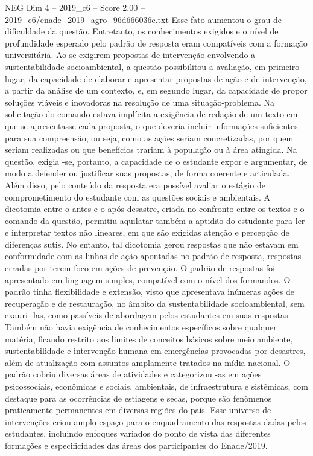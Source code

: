 \begin{textsample}{NEG Dim 4 – 2019\_c6 – Score 2.00 – 2019\_c6/enade\_2019\_agro\_96d666036e.txt}
Esse fato aumentou o grau de dificuldade da questão.
Entretanto, os conhecimentos exigidos e o nível de profundidade esperado pelo padrão de resposta eram compatíveis com a formação universitária.
Ao se exigirem propostas de intervenção envolvendo a sustentabilidade socioambiental, a questão possibilitou a avaliação, em primeiro lugar, da capacidade de elaborar e apresentar propostas de ação e de intervenção, a partir da análise de um contexto, e, em segundo lugar, da capacidade de propor soluções viáveis e inovadoras na resolução de uma situação-problema.
Na solicitação do comando estava implícita a exigência de redação de um texto em que se apresentasse cada proposta, o que deveria incluir informações suficientes para sua compreensão, ou seja, como as ações seriam concretizadas, por quem seriam realizadas ou que benefícios trariam à população ou à área atingida.
Na questão, exigia -se, portanto, a capacidade de o estudante expor e argumentar, de modo a defender ou justificar suas propostas, de forma coerente e articulada.
Além disso, pelo conteúdo da resposta era possível avaliar o estágio de comprometimento do estudante com as questões sociais e ambientais.
A dicotomia entre o antes e o após desastre, criada no confronto entre os textos e o comando da questão, permitiu aquilatar também a aptidão do estudante para ler e interpretar textos não lineares, em que são exigidas atenção e percepção de diferenças sutis.
No entanto, tal dicotomia gerou respostas que não estavam em conformidade com as linhas de ação apontadas no padrão de resposta, respostas erradas por terem foco em ações de prevenção.
O padrão de respostas foi apresentado em linguagem simples, compatível com o nível dos formandos.
O padrão tinha flexibilidade e extensão, visto que apresentava inúmeras ações de recuperação e de restauração, no âmbito da sustentabilidade socioambiental, sem exauri -las, como passíveis de abordagem pelos estudantes em suas respostas.
Também não havia exigência de conhecimentos específicos sobre qualquer matéria, ficando restrito aos limites de conceitos básicos sobre meio ambiente, sustentabilidade e intervenção humana em emergências provocadas por desastres, além de atualização com assuntos amplamente tratados na mídia nacional.
O padrão cobriu diversas áreas de atividades e categorizou -as em ações psicossociais, econômicas e sociais, ambientais, de infraestrutura e sistêmicas, com destaque para as ocorrências de estiagens e secas, porque são fenômenos praticamente permanentes em diversas regiões do país.
Esse universo de intervenções criou amplo espaço para o enquadramento das respostas dadas pelos estudantes, incluindo enfoques variados do ponto de vista das diferentes formações e especificidades das áreas dos participantes do Enade/2019.

\end{textsample}
